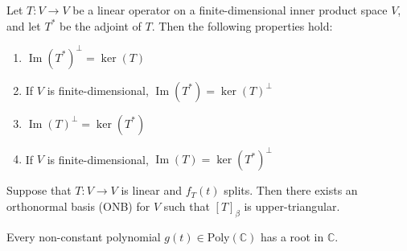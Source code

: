 \documentclass{article}
\newcommand{\C}{\mathbb{C}}
\begin{document}
\begin{theorem}
    Let \( T: V \to V \) be a linear operator on a finite-dimensional inner product space \( V \), and let \( T^* \) be the adjoint of \( T \). Then the following properties hold:
\begin{enumerate}
    \item \(\operatorname{Im}(T^*)^\perp = \ker(T)\)
    \item If \( V \) is finite-dimensional, \(\operatorname{Im}(T^*) = \ker(T)^\perp\)
    \item \(\operatorname{Im}(T)^\perp = \ker(T^*)\)
    \item If \( V \) is finite-dimensional, \(\operatorname{Im}(T) = \ker(T^*)^\perp\)
\end{enumerate}
\end{theorem}







\begin{theorem}[Schur's]
Suppose that \( T: V \to V \) is linear and \( f_T(t) \) splits. Then there exists an orthonormal basis (ONB) for \( V \) such that \( [T]_\beta \) is upper-triangular.
\end{theorem}



\begin{theorem}
    Every non-constant polynomial \(g(t) \in \text{Poly}(\C)\) has a root in \(\C\). 
\end{theorem}
\end{document}
